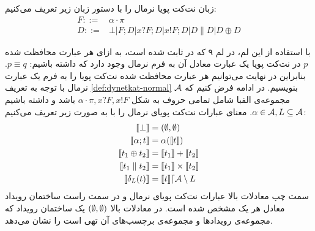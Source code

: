 \begin{definition}
    \label{def:dynetkat-normal}
    زبان نت‌کت پویا‌ نرمال را با دستور زبان زیر تعریف می‌کنیم:
    \begin{align*}
        F ::= & \alpha\cdot\pi                                          \\
        D ::= & \bot | F;D | x?F;D | x!F;D | D \parallel D | D \oplus D
    \end{align*}
\end{definition}
با استفاده از این لم، در لم ۹ که در
\cite{dynetkat}
ثابت شده است،
به ازای هر عبارت محافظت شده 
$p$
در نت‌کت پویا یک عبارت معادل آن به فرم نرمال وجود دارد که داشته باشیم:
$p \equiv q$.
بنابراین در نهایت می‌توانیم هر عبارت محافظت شده نت‌کت پویا را به فرم یک عبارت نرمال 
با توجه به تعریف 
\ref{def:dynetkat-normal}
بنویسیم.
در ادامه فرض کنیم که
$\mathcal{A}$
مجموعه‌ی الفبا شامل تمامی حروف به شکل
$\alpha\cdot\pi,x?F,x!F$
باشد و داشته باشیم
$\alpha \in \mathcal{A}, L \subseteq \mathcal{A}$.
معنای عبارات نت‌کت پویای نرمال را با به صورت زیر تعریف می‌کنیم:
\begin{align*}
    \llbracket \bot \rrbracket              & = (\emptyset,\emptyset)                               \\
    \llbracket \alpha;t \rrbracket          & = \alpha(\llbracket t \rrbracket)                       \\
    \llbracket t_1 \oplus t_2 \rrbracket    & = \llbracket t_1 \rrbracket + \llbracket t_2 \rrbracket                 \\
    \llbracket t_1 \parallel t_2 \rrbracket & = \llbracket t_1 \rrbracket \times \llbracket t_2 \rrbracket            \\
    \llbracket \delta_{L}(t) \rrbracket     & = \llbracket t \rrbracket\lceil \mathcal{A} \setminus L
\end{align*}
سمت چپ معادلات بالا عبارات نت‌کت پویای نرمال و در سمت راست ساختمان رویداد معادل هر یک مشخص شده است.
در معادلات بالا 
$(\emptyset,\emptyset)$
یک ساختمان رویداد که مجموعه‌ی رویداد‌ها و مجموعه‌ی برچسب‌های آن تهی است را نشان می‌دهد.